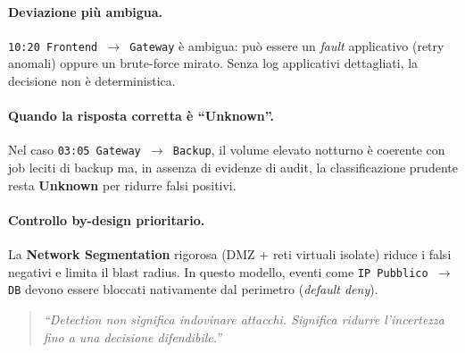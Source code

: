 \documentclass[12pt,a4paper]{article}
\begin{document}
\paragraph{Deviazione più ambigua.}
\texttt{10:20 Frontend \(\rightarrow\) Gateway} è ambigua: può essere un \textit{fault} applicativo (retry anomali) oppure un brute-force mirato. Senza log applicativi dettagliati, la decisione non è deterministica.

\paragraph{Quando la risposta corretta è ``Unknown''.}
Nel caso \texttt{03:05 Gateway \(\rightarrow\) Backup}, il volume elevato notturno è coerente con job leciti di backup ma, in assenza di evidenze di audit, la classificazione prudente resta \textbf{Unknown} per ridurre falsi positivi.

\paragraph{Controllo by-design prioritario.}
La \textbf{Network Segmentation} rigorosa (DMZ + reti virtuali isolate) riduce i falsi negativi e limita il blast radius. In questo modello, eventi come \texttt{IP Pubblico \(\rightarrow\) DB} devono essere bloccati nativamente dal perimetro (\textit{default deny}).

\begin{quote}
\itshape
``Detection non significa indovinare attacchi. Significa ridurre l'incertezza fino a una decisione difendibile.''
\end{quote} 
\end{document}
